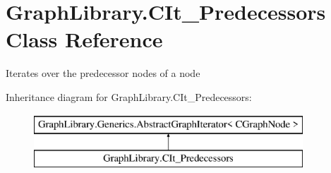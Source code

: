 \hypertarget{class_graph_library_1_1_c_it___predecessors}{}\section{Graph\+Library.\+C\+It\+\_\+\+Predecessors Class Reference}
\label{class_graph_library_1_1_c_it___predecessors}


Iterates over the predecessor nodes of a node  


Inheritance diagram for Graph\+Library.\+C\+It\+\_\+\+Predecessors\+:\begin{figure}[H]
\begin{center}
\leavevmode
\includegraphics[height=2.000000cm]{class_graph_library_1_1_c_it___predecessors}
\end{center}
\end{figure}
